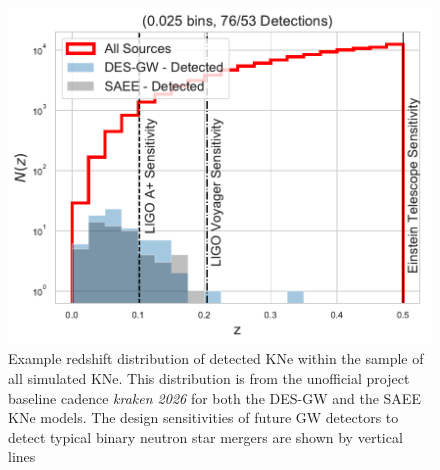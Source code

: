 \begin{figure}[h!]
  \centering
  \includegraphics[scale=0.82]{figures/both_nz_base_kraken_2026}
  \caption{Example redshift distribution of detected KNe within the sample of all simulated KNe. This distribution is from the unofficial project baseline cadence \protect \textit{kraken 2026} for both the DES-GW and the SAEE KNe models. The design sensitivities of future GW detectors to detect typical binary neutron star mergers are shown by vertical lines \citep{Chen2017a, Chamberlain2017, Scolnic2017a}}
  \label{fig:typical_nz}
\end{figure}

\FloatBarrier


